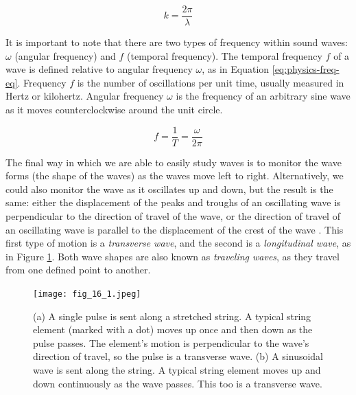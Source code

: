 \begin{equation}
	k = \frac{2\pi}{\lambda}
	\label{eq:physics-wavelength}
\end{equation}

It is important to note that there are two types of frequency within sound waves: $\omega$ (angular frequency) and $f$ (temporal frequency). The temporal frequency $f$ of a wave is defined relative to angular frequency $\omega$, as in Equation \ref{eq:physics-freq-eq}. Frequency $f$ is the number of oscillations per unit time, usually measured in Hertz or kilohertz. Angular frequency $\omega$ is the frequency of an arbitrary sine wave as it moves counterclockwise around the unit circle.

\begin{equation}
	f = \frac{1}{T} = \frac{\omega}{2\pi}
	\label{eq:physics-freq-eq}
\end{equation}

The final way in which we are able to easily study waves is to monitor the wave forms (the shape of the waves) as the waves move left to right. Alternatively, we could also monitor the wave as it oscillates up and down, but the result is the same: either the displacement of the peaks and troughs of an oscillating wave is perpendicular to the direction of travel of the wave, or the direction of travel of an oscillating wave is parallel to the displacement of the crest of the wave \cite{Halliday_Resnick_Walker_2005}. This first type of motion is a \textit{transverse wave}, and the second is a \textit{longitudinal wave}, as in Figure \ref{fig:transverse-wave-longitudinal-wave}. Both wave shapes are also known as \textit{traveling waves}, as they travel from one defined point to another.

\begin{figure}[ht]
  \centering
  \texttt{[image: fig\_16\_1.jpeg]}
  \caption{(a) A single pulse is sent along a stretched string. A typical string element (marked with a dot) moves up once and then down as the pulse passes. The element’s motion is perpendicular to the wave’s direction of travel, so the pulse is a transverse wave. (b) A sinusoidal wave is sent along the string. A typical string element moves up and down continuously as the wave passes. This too is a transverse wave.} \cite{Halliday_Resnick_Walker_2005}
  \label{fig:transverse-wave-longitudinal-wave}
\end{figure}

